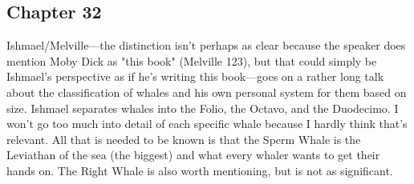 \subsection{Chapter 32}

Ishmael/Melville---the distinction isn't perhaps as clear because the speaker
does mention Moby Dick as "this book" (Melville 123), but that could simply be
Ishmael's perspective as if he's writing this book---goes on a rather long talk
about the classification of whales and his own personal system for them based
on size. Ishmael separates whales into the Folio, the Octavo, and the
Duodecimo. I won't go too much into detail of each specific whale because I
hardly think that's relevant. All that is needed to be known is that the Sperm
Whale is the Leviathan of the sea (the biggest) and what every whaler wants to
get their hands on. The Right Whale is also worth mentioning, but is not as
significant.
